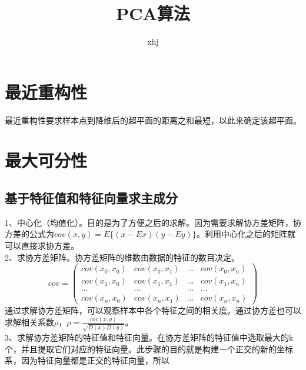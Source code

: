 \documentclass{article}
\author{xhj}
\title{PCA算法}
\begin{document}
\begin{CJK}{UTF8}{gkai}    %
\maketitle

\section{最近重构性}
最近重构性要求样本点到降维后的超平面的距离之和最短，以此来确定该超平面。

\section{最大可分性}
\subsection{基于特征值和特征向量求主成分}
1、中心化（均值化）。目的是为了方便之后的求解。因为需要求解协方差矩阵，协方差的公式为$cov(x,y)=E\{(x-Ex)(y-Ey)\}$。利用中心化之后的矩阵就可以直接求协方差。\\

2、求协方差矩阵。协方差矩阵的维数由数据的特征的数目决定。
\begin{equation}
cov=
\left(
\begin{array}{cccc}
cov(x_0,x_0) & cov(x_0,x_1) & ... & cov(x_0,x_n)\\
cov(x_1,x_0) & cov(x_1,x_1) & ... & cov(x_1,x_n)\\
... & ... & ... & ...\\
cov(x_n,x_0) & cov(x_n,x_1) & ... & cov(x_n,x_n)
\end{array}
\right)
\end{equation}
通过求解协方差矩阵，可以观察样本中各个特征之间的相关度。通过协方差也可以求解相关系数$\rho$，$\rho=\frac{cov(x,y)}{\sqrt{D(x)D(y)}}$。\\

3、求解协方差矩阵的特征值和特征向量。在协方差矩阵的特征值中选取最大的k个，并且提取它们对应的特征向量。此步骤的目的就是构建一个正交的新的坐标系，因为特征向量都是正交的特征向量，所以
\end{CJK}
\end{document}
